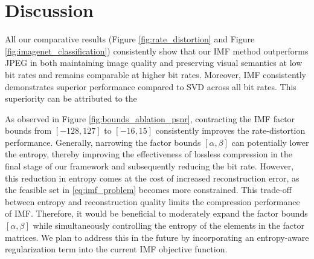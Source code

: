 \section{Discussion} \label{sec:discussion}

All our comparative results (Figure \ref{fig:rate_distortion} and Figure \ref{fig:imagenet_classification}) consistently show that our IMF method outperforms JPEG in both maintaining image quality and preserving visual semantics at low bit rates and remains comparable at higher bit rates. Moreover, IMF consistently demonstrates superior performance compared to SVD across all bit rates. This superiority can be attributed to the 


As observed in Figure \ref{fig:bounds_ablation_psnr}, contracting the IMF factor bounds from $[-128, 127]$ to $[-16, 15]$ consistently improves the rate-distortion performance. Generally, narrowing the factor bounds $[\alpha, \beta]$ can potentially lower the entropy, thereby improving the effectiveness of lossless compression in the final stage of our framework and subsequently reducing the bit rate. However, this reduction in entropy comes at the cost of increased reconstruction error, as the feasible set in \eqref{eq:imf_problem} becomes more constrained. This trade-off between entropy and reconstruction quality limits the compression performance of IMF. Therefore, it would be beneficial to moderately expand the factor bounds $[\alpha, \beta]$ while simultaneously controlling the entropy of the elements in the factor matrices. We plan to address this in the future by incorporating an entropy-aware regularization term into the current IMF objective function.

